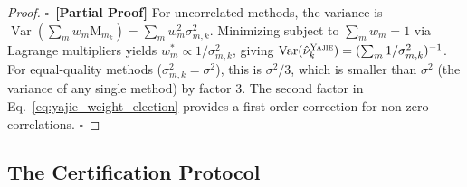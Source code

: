 \documentclass[11pt,a4paper]{article}
\theoremstyle{definition}
\newcommand{\rigorPartial}[0]{$\square$~\textbf{[Partial Proof]}}
\newcommand{\Yajie}{\textsc{Yajie}}
\DeclareMathOperator{\Var}{Var}
\newcommand{\method}[1]{\mathrm{M}_{#1}}
\begin{document}
\begin{proof}\rigorPartial
For uncorrelated methods, the variance is $\Var(\sum_m w_m \method{m}_k) = \sum_m w_m^2 \sigma_{m,k}^2$. Minimizing subject to $\sum_m w_m = 1$ via Lagrange multipliers yields $w_m^* \propto 1/\sigma_{m,k}^2$, giving $\Var(\hat{\nu}_k^{\Yajie}) = (\sum_m 1/\sigma_{m,k}^2)^{-1}$. For equal-quality methods ($\sigma_{m,k}^2 = \sigma^2$), this is $\sigma^2/3$, which is smaller than $\sigma^2$ (the variance of any single method) by factor 3. The second factor in Eq.~\eqref{eq:yajie_weight_election} provides a first-order correction for non-zero correlations. \hfill $\square$
\end{proof}
\subsection{The Certification Protocol}
\end{document}
